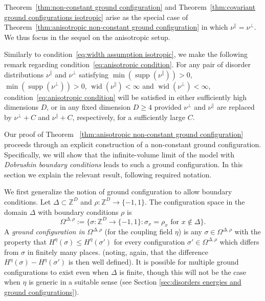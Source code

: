 \documentclass[11pt, reqno]{amsart}
\newcommand{\Z}{\mathbb{Z}}
\DeclareMathOperator{\supp}{supp}
\DeclareMathOperator{\wid}{wid}
\numberwithin{equation}{section}
\begin{document}
Theorem~\ref{thm:non-constant ground configuration} and Theorem~\ref{thm:covariant ground configurations isotropic} arise as the special case of Theorem~\ref{thm:anisotropic non-constant ground configuration} in which $\nu^\parallel = \nu^\perp$. We thus focus in the sequel on the anisotropic setup.

Similarly to condition~\eqref{eq:width assumption isotropic}, we make the following remark regarding condition~\eqref{eq:anisotropic condition}. For any pair of disorder distributions $\nu^\parallel$ and $\nu^\perp$ satisfying $\min(\supp(\nu^\parallel))>0$, $\min(\supp(\nu^\perp))>0$, $\wid(\nu^\parallel)<\infty$ and $\wid(\nu^\perp)<\infty$, condition~\eqref{eq:anisotropic condition} will be satisfied in either sufficiently high dimensions $D$, or in any fixed dimension $D\ge 4$ provided $\nu^\perp$ and $\nu^\parallel$ are replaced by $\nu^\perp+C$ and $\nu^\parallel+C$, respectively, for a sufficiently large $C$. 

\smallskip

Our proof of Theorem ~\ref{thm:anisotropic non-constant ground configuration}
proceeds through an explicit construction of a non-constant ground configuration. Specifically, we will show that the infinite-volume limit of the model with \emph{Dobrushin boundary conditions} leads to such a ground configuration. In this section we explain the relevant result, following required notation.

We first generalize the notion of ground configuration to allow boundary conditions. Let $\Delta\subset\Z^D $ and $ \rho\colon \Z^D \to \{-1,1\} $. The configuration space in the domain $\Delta$ with boundary conditions $\rho$ is
\begin{equation}\label{eq:configuration space in Z^D}
\Omega^{\Delta,\rho}:=\{\sigma\colon \Z^D\to\{-1,1\}\colon \text{$\sigma_x = \rho_x$ for $x\notin\Delta$}\}.
\end{equation}
A \emph{ground configuration in $\Omega^{\Delta,\rho}$} (for the coupling field $\eta$) is any $\sigma\in\Omega^{\Delta,\rho}$ with the property that $H^\eta(\sigma)\le H^{\eta}(\sigma')$ for every configuration $\sigma'\in\Omega^{\Delta,\rho}$ which differs from $\sigma$ in finitely many places.
(noting, again, that the difference $H^{\eta}(\sigma)-H^{\eta}(\sigma')$ is then well defined). It is possible for multiple ground configurations to exist even when $\Delta$ is finite, though this will not be the case when $\eta$ is generic in a suitable sense (see Section \ref{sec:disorders energies and ground configurations}). 
\end{document}
